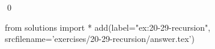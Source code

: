 
\begin{ex}
  \label{ex:20-29-recursion}
  
  \qed
\end{ex}
\begin{python0}
from solutions import *
add(label="ex:20-29-recursion",
    srcfilename='exercises/20-29-recursion/answer.tex')
\end{python0}
